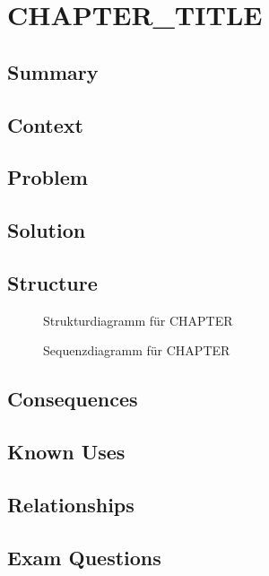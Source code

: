 \chapter{CHAPTER_TITLE}

\section{Summary}
\section{Context}
\section{Problem}
\section{Solution}

\section{Structure}
\begin{figure}[H]
  \centering
  
  \caption{Strukturdiagramm f\"ur CHAPTER}
\end{figure}
\begin{figure}[H]
  \centering
  
  \caption{Sequenzdiagramm f\"ur CHAPTER}
\end{figure}
\section{Consequences}
\section{Known Uses}
\section{Relationships}
\section{Exam Questions}

